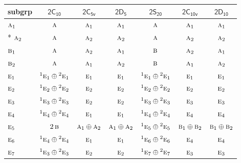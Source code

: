 \documentclass[10pt,a4paper]{article}
\numberwithin{equation}{section}
\newcommand{\grp}[1]{\mathsf{#1}}
\newcommand{\irr}[1]{\text{\normalfont\scshape #1}}
\newcommand{\conjpair}[1]{{}^{#1}}
\begin{document}
{\small\begin{longtable}{@{}lcccccc@{}}\toprule
subgrp & \href{2C10.pdf}{$\grp{2C_{10}}$} & \href{2C5v.pdf}{$\grp{2C_{5v}}$} & \href{2D5.pdf}{$\grp{2D_{5}}$} & \href{2S20.pdf}{$\grp{2S_{20}}$} & \href{2C10v.pdf}{$\grp{2C_{10v}}$} & \href{2D10.pdf}{$\grp{2D_{10}}$}\\\midrule\endhead
\bottomrule\endfoot\endlastfoot
$\irr{a}_{1}$ & $\irr{a}$ & $\irr{a}_{1}$ & $\irr{a}_{1}$ & $\irr{a}$ & $\irr{a}_{1}$ & $\irr{a}_{1}$\\*
$\irr{a}_{2}$ & $\irr{a}$ & $\irr{a}_{2}$ & $\irr{a}_{2}$ & $\irr{a}$ & $\irr{a}_{2}$ & $\irr{a}_{2}$\\
$\irr{b}_{1}$ & $\irr{a}$ & $\irr{a}_{2}$ & $\irr{a}_{1}$ & $\irr{b}$ & $\irr{a}_{2}$ & $\irr{a}_{1}$\\
$\irr{b}_{2}$ & $\irr{a}$ & $\irr{a}_{1}$ & $\irr{a}_{2}$ & $\irr{b}$ & $\irr{a}_{1}$ & $\irr{a}_{2}$\\
$\irr{e}_{1}$ & $\conjpair{1}\irr{e}_{1}\oplus \conjpair{2}\irr{e}_{1}$ & $\irr{e}_{1}$ & $\irr{e}_{1}$ & $\conjpair{1}\irr{e}_{1}\oplus \conjpair{2}\irr{e}_{1}$ & $\irr{e}_{1}$ & $\irr{e}_{1}$\\
$\irr{e}_{2}$ & $\conjpair{1}\irr{e}_{2}\oplus \conjpair{2}\irr{e}_{2}$ & $\irr{e}_{2}$ & $\irr{e}_{2}$ & $\conjpair{1}\irr{e}_{2}\oplus \conjpair{2}\irr{e}_{2}$ & $\irr{e}_{2}$ & $\irr{e}_{2}$\\
$\irr{e}_{3}$ & $\conjpair{1}\irr{e}_{3}\oplus \conjpair{2}\irr{e}_{3}$ & $\irr{e}_{2}$ & $\irr{e}_{2}$ & $\conjpair{1}\irr{e}_{3}\oplus \conjpair{2}\irr{e}_{3}$ & $\irr{e}_{3}$ & $\irr{e}_{3}$\\
$\irr{e}_{4}$ & $\conjpair{1}\irr{e}_{4}\oplus \conjpair{2}\irr{e}_{4}$ & $\irr{e}_{1}$ & $\irr{e}_{1}$ & $\conjpair{1}\irr{e}_{4}\oplus \conjpair{2}\irr{e}_{4}$ & $\irr{e}_{4}$ & $\irr{e}_{4}$\\
$\irr{e}_{5}$ & $2\,\irr{b}$ & $\irr{a}_{1}\oplus \irr{a}_{2}$ & $\irr{a}_{1}\oplus \irr{a}_{2}$ & $\conjpair{1}\irr{e}_{5}\oplus \conjpair{2}\irr{e}_{5}$ & $\irr{b}_{1}\oplus \irr{b}_{2}$ & $\irr{b}_{1}\oplus \irr{b}_{2}$\\
$\irr{e}_{6}$ & $\conjpair{1}\irr{e}_{4}\oplus \conjpair{2}\irr{e}_{4}$ & $\irr{e}_{1}$ & $\irr{e}_{1}$ & $\conjpair{1}\irr{e}_{6}\oplus \conjpair{2}\irr{e}_{6}$ & $\irr{e}_{4}$ & $\irr{e}_{4}$\\
$\irr{e}_{7}$ & $\conjpair{1}\irr{e}_{3}\oplus \conjpair{2}\irr{e}_{3}$ & $\irr{e}_{2}$ & $\irr{e}_{2}$ & $\conjpair{1}\irr{e}_{7}\oplus \conjpair{2}\irr{e}_{7}$ & $\irr{e}_{3}$ & $\irr{e}_{3}$\\

\end{longtable}}
\end{document}
